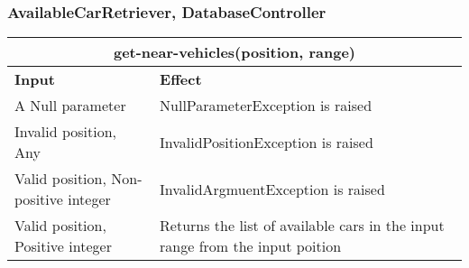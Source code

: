 \subsubsection{AvailableCarRetriever, DatabaseController} 
\begin{tabular}{|p{5cm}|p{7cm}|}
\hline
\multicolumn{2}{|c|}{get-near-vehicles(position, range)} \\
\hline
\textbf{Input} & \textbf{Effect} \\

\hline
A Null parameter & NullParameterException is raised \\

\hline
Invalid position, Any & InvalidPositionException is raised \\

\hline
Valid position, Non-positive integer & InvalidArgmuentException is raised \\

\hline
Valid position, Positive integer & Returns the list of available cars in the input range from the input poition \\
\hline
\end{tabular}